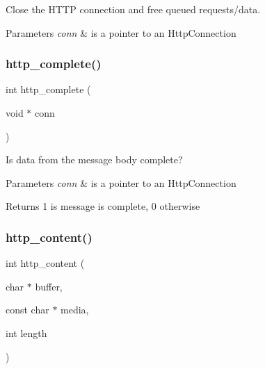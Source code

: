 Close the H\+T\+TP connection and free queued requests/data. 


\begin{DoxyParams}{Parameters}
{\em conn} & is a pointer to an Http\+Connection \\
\hline
\end{DoxyParams}
\mbox{\label{group__http__connection_ga840e20735c835fbd29956a2d82b5ef71}} 
\subsubsection{\texorpdfstring{http\+\_\+complete()}{http\_complete()}}
{\footnotesize\ttfamily int http\+\_\+complete (\begin{DoxyParamCaption}\item[{void $\ast$}]{conn }\end{DoxyParamCaption})}



Is data from the message body complete? 


\begin{DoxyParams}{Parameters}
{\em conn} & is a pointer to an Http\+Connection \\
\hline
\end{DoxyParams}
\begin{DoxyReturn}{Returns}
1 is message is complete, 0 otherwise 
\end{DoxyReturn}
\mbox{\label{group__http__connection_ga5b43c4092965e502da226511bb574b44}} 
\subsubsection{\texorpdfstring{http\+\_\+content()}{http\_content()}}
{\footnotesize\ttfamily int http\+\_\+content (\begin{DoxyParamCaption}\item[{char $\ast$}]{buffer,  }\item[{const char $\ast$}]{media,  }\item[{int}]{length }\end{DoxyParamCaption})}




